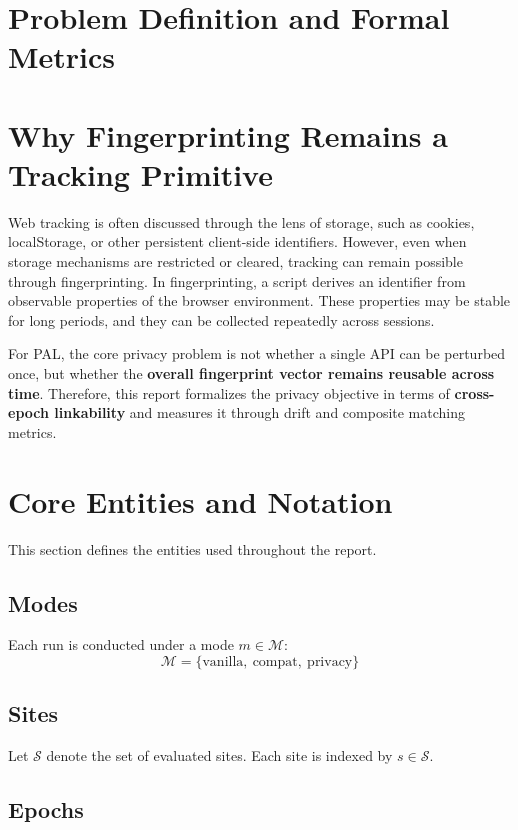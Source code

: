 \documentclass[11pt]{report}
\begin{document}
\section{Problem Definition and Formal Metrics}

\section{Why Fingerprinting Remains a Tracking Primitive}

Web tracking is often discussed through the lens of storage, such as cookies, localStorage, or other persistent client-side identifiers. However, even when storage mechanisms are restricted or cleared, tracking can remain possible through fingerprinting. In fingerprinting, a script derives an identifier from observable properties of the browser environment. These properties may be stable for long periods, and they can be collected repeatedly across sessions.

For PAL, the core privacy problem is not whether a single API can be perturbed once, but whether the \textbf{overall fingerprint vector remains reusable across time}. Therefore, this report formalizes the privacy objective in terms of \textbf{cross-epoch linkability} and measures it through drift and composite matching metrics.

\section{Core Entities and Notation}

This section defines the entities used throughout the report.

\subsection{Modes}

Each run is conducted under a mode $m \in \mathcal{M}$:
\[
\mathcal{M} = \{\text{vanilla},\ \text{compat},\ \text{privacy}\}
\]

\subsection{Sites}

Let $\mathcal{S}$ denote the set of evaluated sites. Each site is indexed by $s \in \mathcal{S}$.

\subsection{Epochs}
\end{document}
